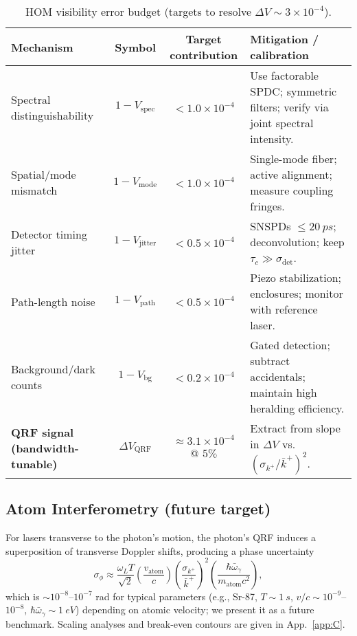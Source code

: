 \documentclass[aps,11pt]{article}
\newcommand{\kplus}{k^{+}}
\newcommand{\kbar}{\bar{k}^{+}}
\begin{document}
\begin{table}[t]
\centering
\caption{HOM visibility error budget (targets to resolve \(\Delta V\sim 3\times 10^{-4}\)).}
\label{tab:budget}
\begin{tabular}{@{}lccp{7.5cm}@{}}
\toprule
Mechanism & Symbol & Target contribution & Mitigation / calibration \\
\midrule
Spectral distinguishability & \(1-V_{\text{spec}}\) & \(<1.0\times10^{-4}\) & Use factorable SPDC; symmetric filters; verify via joint spectral intensity. \\
Spatial/mode mismatch & \(1-V_{\text{mode}}\) & \(<1.0\times10^{-4}\) & Single-mode fiber; active alignment; measure coupling fringes. \\
Detector timing jitter & \(1-V_{\text{jitter}}\) & \(<0.5\times10^{-4}\) & SNSPDs \(\le 20~\si{ps}\); deconvolution; keep \(\tau_c\gg\sigma_{\text{det}}\). \\
Path-length noise & \(1-V_{\text{path}}\) & \(<0.5\times10^{-4}\) & Piezo stabilization; enclosures; monitor with reference laser. \\
Background/dark counts & \(1-V_{\text{bg}}\) & \(<0.2\times10^{-4}\) & Gated detection; subtract accidentals; maintain high heralding efficiency. \\
\midrule
\textbf{QRF signal (bandwidth-tunable)} & \(\Delta V_{\text{QRF}}\) & \(\approx3.1\times10^{-4}\) @ \(5\%\) & Extract from slope in \(\Delta V\) vs.~\((\sigma_{\kplus}/\kbar)^2\). \\
\bottomrule
\end{tabular}
\end{table}

\subsection{Atom Interferometry (future target)}\label{sec:atom}
For lasers transverse to the photon’s motion, the photon's QRF induces a superposition of transverse Doppler shifts, producing a phase uncertainty
\begin{equation}
\sigma_{\phi} \approx \frac{\omega_{L}T}{\sqrt{2}}\!\left(\frac{v_{\mathrm{atom}}}{c}\right)\!
\left(\frac{\sigma_{\kplus}}{\kbar}\right)^{2}\!
\left(\frac{\hbar\bar{\omega}_{\gamma}}{m_{\mathrm{atom}}c^{2}}\right),
\end{equation}
which is \(\sim 10^{-8}\)–\(10^{-7}\) rad for typical parameters (e.g., Sr-87, \(T\!\sim\!1~\si{s}\), \(v/c\!\sim\!10^{-9}\)–\(10^{-8}\), \(\hbar\bar\omega_\gamma\!\sim\!1~\si{eV}\)) depending on atomic velocity; we present it as a future benchmark. Scaling analyses and break-even contours are given in App.~\ref{app:C}.
\end{document}
